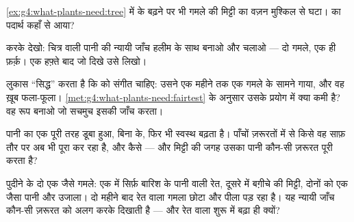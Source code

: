 \begin{exercise}[$\star$]\label{exo:g4:what-plants-need:7}
\cref{ex:g4:what-plants-need:tree} में  के बढ़ने पर भी गमले की
मिट्टी का वज़न मुश्किल से घटा।  का पदार्थ कहाँ से आया?
\end{exercise}

\begin{exercise}[$\star$]\label{exo:g4:what-plants-need:8}
करके देखो: चित्र वाली पानी की न्यायी जाँच हलीम के साथ बनाओ और चलाओ ---
दो गमले, एक ही फ़र्क़। एक हफ़्ते बाद जो दिखे उसे लिखो।
\end{exercise}

\begin{exercise}[$\star\star$]\label{exo:g4:what-plants-need:9}
लुकास ``सिद्ध'' करता है कि  को संगीत चाहिए: उसने एक महीने तक एक
गमले के सामने गाया, और वह ख़ूब फला-फूला।
\cref{met:g4:what-plants-need:fairtest} के अनुसार उसके प्रयोग में क्या
कमी है? वह रूप बनाओ जो सचमुच इसकी जाँच करता।
\end{exercise}

\begin{exercise}[$\star\star$]\label{exo:g4:what-plants-need:10}
पानी का एक  पूरी तरह डूबा हुआ, बिना  के, फिर भी स्वस्थ बढ़ता
है। पाँचों ज़रूरतों में से किसे वह साफ़ तौर पर अब भी पूरा कर रहा है,
और कैसे --- और मिट्टी की जगह उसका पानी कौन-सी ज़रूरत पूरी करता है?
\end{exercise}

\begin{exercise}[$\star\star\star$]\label{exo:g4:what-plants-need:11}
पुदीने के दो एक जैसे गमले: एक में सिर्फ़ बारिश के पानी वाली रेत, दूसरे
में बग़ीचे की मिट्टी, दोनों को एक जैसा पानी और उजाला। दो महीने बाद रेत
वाला गमला छोटा और पीला पड़ रहा है। यह न्यायी जाँच कौन-सी ज़रूरत को अलग
करके दिखाती है --- और रेत वाला  शुरू में बढ़ा ही क्यों?
\end{exercise}
